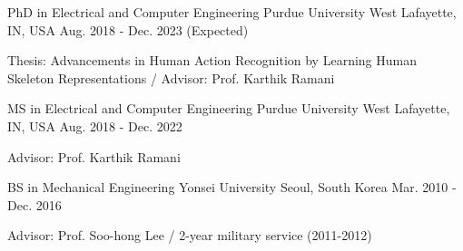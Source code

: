 


\begin{cventries}


    \cventry
    {PhD in Electrical and Computer Engineering} %
    {Purdue University} %
    {West Lafayette, IN, USA} %
    {Aug. 2018 - Dec. 2023 (Expected)} %
    { %
    \begin{cvitems}
        \item {Thesis: Advancements in Human Action Recognition by Learning Human Skeleton Representations / Advisor: Prof. Karthik Ramani}
    \end{cvitems}
    }

    \cventry
    {MS in Electrical and Computer Engineering} %
    {Purdue University} %
    {West Lafayette, IN, USA} %
    {Aug. 2018 - Dec. 2022} %
    { %
    \begin{cvitems}
        \item {Advisor: Prof. Karthik Ramani}
    \end{cvitems}
    }

    \cventry
    {BS in Mechanical Engineering} %
    {Yonsei University} %
    {Seoul, South Korea} %
    {Mar. 2010 - Dec. 2016} %
    { %
    \begin{cvitems}
        \item {Advisor: Prof. Soo-hong Lee / 2-year military service (2011-2012)}
    \end{cvitems}
    }

\end{cventries}
